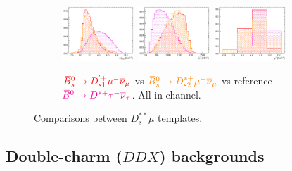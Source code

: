 \begin{figure}[!htb]
    \begin{subfigure}{\textwidth}
        \centering
        \includegraphics[width=0.3\textwidth]{figs-fit-fit-templates/histo-comp/Dst_iso_DstTau__vs__Dst_iso_Ds1pMu__vs__D0_iso_Ds2Mu__m2miss.pdf}
        \includegraphics[width=0.3\textwidth]{figs-fit-fit-templates/histo-comp/Dst_iso_DstTau__vs__Dst_iso_Ds1pMu__vs__D0_iso_Ds2Mu__el.pdf}
        \includegraphics[width=0.3\textwidth]{figs-fit-fit-templates/histo-comp/Dst_iso_DstTau__vs__Dst_iso_Ds1pMu__vs__D0_iso_Ds2Mu__q2.pdf}
        \caption{
            $\textcolor{red}{{{\kern 0.18em\overline{\kern -0.18em B}}{}^0_{s}} \rightarrow D_{s1}^{'+}{\mu^-}{{\overline{\nu}}_\mu}}$
            vs
            $\textcolor{orange}{{{\kern 0.18em\overline{\kern -0.18em B}}{}^0_{s}} \rightarrow D_{s2}^{*+}{\mu^-}{{\overline{\nu}}_\mu}}$
            vs reference
            $\textcolor{magenta}{{{\kern 0.18em\overline{\kern -0.18em B}}{}^0} \rightarrow {\ensuremath{{D}^{*+}}}{\ensuremath{\tau^-}}{\ensuremath{{\overline{\nu}}_\tau}}}$.
            All in \Dstar channel.
        }
    \end{subfigure}

    \caption{Comparisons between $D_s^{**}\mu$ templates.}
    \label{fig:d_s-templates}
\end{figure}


\subsection{Double-charm ($DDX$) backgrounds}
\label{ref:fit:tmpl:ddx}

